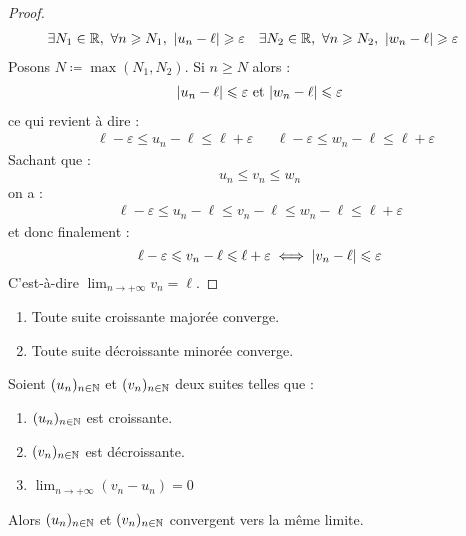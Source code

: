 \begin{proof}
    \begin{align*}
        &\exists N_1 \in \mathbb{R},\ \forall n \geqslant N_1,\ \abs{u_n - \ell} \geqslant \varepsilon &
        &\exists N_2 \in \mathbb{R},\ \forall n \geqslant N_2,\ \abs{w_n - \ell} \geqslant \varepsilon
    \end{align*}
    Posons $N \coloneqq \max(N_1, N_2)$. Si $n \geq N$ alors :
    \begin{align*}
        \abs{u_n - \ell} \leqslant \varepsilon \text{ et } \abs{w_n - \ell} \leqslant \varepsilon
    \end{align*}
    ce qui revient à dire : 
    \begin{align*}
        &\ell - \varepsilon \leq u_n - \ell \leq \ell + \varepsilon & &\ell - \varepsilon \leq w_n - \ell \leq \ell + \varepsilon
    \end{align*}
    Sachant que :
    \[ u_n \leq v_n \leq w_n \]
    on a :
    \begin{align*}
        \ell - \varepsilon \leq u_n - \ell \leq v_n - \ell \leq w_n - \ell \leq \ell + \varepsilon
    \end{align*}
    et donc finalement :
    \[ \ell - \varepsilon \leqslant v_n - \ell \leqslant \ell + \varepsilon \iff \abs{v_n - \ell} \leqslant \varepsilon \]
    C'est-à-dire $\lim_{n \to +\infty} v_n = \ell$.
\end{proof}

\begin{theorem}
    \begin{enumerate}
        \item Toute suite croissante majorée converge.
        \item Toute suite décroissante minorée converge.
    \end{enumerate}
\end{theorem}

\begin{theorem}
    Soient $(u_n)_{n \in \mathbb{N}}$ et $(v_n)_{n \in \mathbb{N}}$ deux suites telles que :
    \begin{multicols}{3}
        \begin{enumerate}
            \item $(u_n)_{n \in \mathbb{N}}$ est croissante.
            \item $(v_n)_{n \in \mathbb{N}}$ est décroissante.
            \item $\lim_{n \to +\infty} (v_n - u_n) = 0$
        \end{enumerate}
    \end{multicols}
    \noindent Alors $(u_n)_{n \in \mathbb{N}}$ et $(v_n)_{n \in \mathbb{N}}$ convergent vers la même limite.
\end{theorem}

